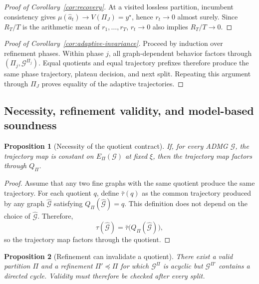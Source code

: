 \documentclass[twoside]{article}
\newtheorem{proposition}{Proposition}
\newcommand{\Gg}{\mathcal{G}}
\begin{document}
\begin{proof}[Proof of Corollary~\ref{cor:recovery}]
At a visited lossless partition, incumbent consistency gives
$\mu(\hat a_t)\to V(\Pi_J)=y^\star$, hence $r_t\to0$ almost surely.
Since \(R_T/T\) is the arithmetic mean of \(r_1,\ldots,r_T\), \(r_t\to0\) also implies \(R_T/T\to0\).
\end{proof}

\begin{proof}[Proof of Corollary~\ref{cor:adaptive-invariance}]
Proceed by induction over refinement phases. Within phase $j$, all graph-dependent behavior factors through $(\Pi_j,\Gg^{\Pi_j})$. Equal quotients and equal trajectory prefixes therefore produce the same phase trajectory, plateau decision, and next split. Repeating this argument through $\Pi_J$ proves equality of the adaptive trajectories.
\end{proof}

\subsection{Necessity, refinement validity, and model-based soundness}

\begin{proposition}[Necessity of the quotient contract]
\label{prop:converse}
If, for every ADMG $\Gg$, the trajectory map is constant on
$E_\Pi(\Gg)$ at fixed $\xi$, then the trajectory map
factors through $Q_\Pi$.
\end{proposition}

\begin{proof}
Assume that any two fine graphs with the same quotient produce the same trajectory. For each quotient $q$, define $\bar\tau(q)$ as the common trajectory produced by any graph $\widehat{\mathcal G}$ satisfying $Q_\Pi(\widehat{\mathcal G})=q$. This definition does not depend on the choice of $\widehat{\Gg}$. Therefore,
\[
  \tau(\widehat{\mathcal G})=\bar\tau\bigl(Q_\Pi(\widehat{\mathcal G})\bigr),
\]
so the trajectory map factors through the quotient.
\end{proof}

\begin{proposition}[Refinement can invalidate a quotient]
\label{prop:refinement-validity}
There exist a valid partition $\Pi$ and a refinement $\Pi'\preceq\Pi$ for which $\Gg^\Pi$ is acyclic but $\Gg^{\Pi'}$ contains a directed cycle. Validity must therefore be checked after every split.
\end{proposition}
\end{document}
